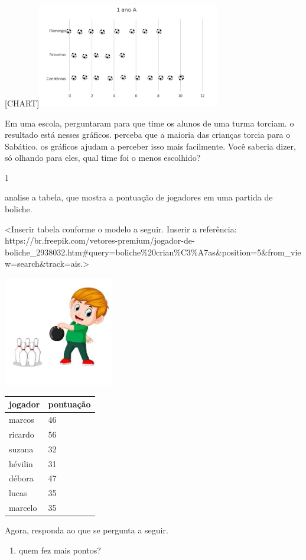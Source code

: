 {{[}CHART{]}}\includegraphics[width=3.13415in,height=1.79094in]{media/image94.png}

Em uma escola, perguntaram para que time os alunos de uma turma torciam. o
resultado está nesses gráficos. perceba que a maioria das crianças
torcia para o Sabático. os gráficos ajudam a perceber isso mais facilmente. Você saberia dizer, só olhando para eles, qual time foi o menos escolhido?


\num{1}

analise a tabela, que mostra a pontuação de jogadores em uma partida de
boliche.

\textless{}Inserir tabela conforme o modelo a seguir. Inserir a
referência:
https://br.freepik.com/vetores-premium/jogador-de-boliche\_2938032.htm\#query=boliche\%20crian\%C3\%A7as\&position=5\&from\_view=search\&track=ais.\textgreater{}

\includegraphics[width=1.88542in,height=1.88542in]{media/image95.jpg}

\begin{longtable}[]{@{}ll@{}}
\toprule
jogador & pontuação\tabularnewline
\midrule
\endhead
marcos & 46\tabularnewline
ricardo & 56\tabularnewline
suzana & 32\tabularnewline
hévilin & 31\tabularnewline
débora & 47\tabularnewline
lucas & 35\tabularnewline
marcelo & 35\tabularnewline
\bottomrule
\end{longtable}

Agora, responda ao que se pergunta a seguir.

\begin{enumerate}
\def\labelenumi{\Alph{enumi})}
\item
  quem fez mais pontos?
\end{enumerate}

